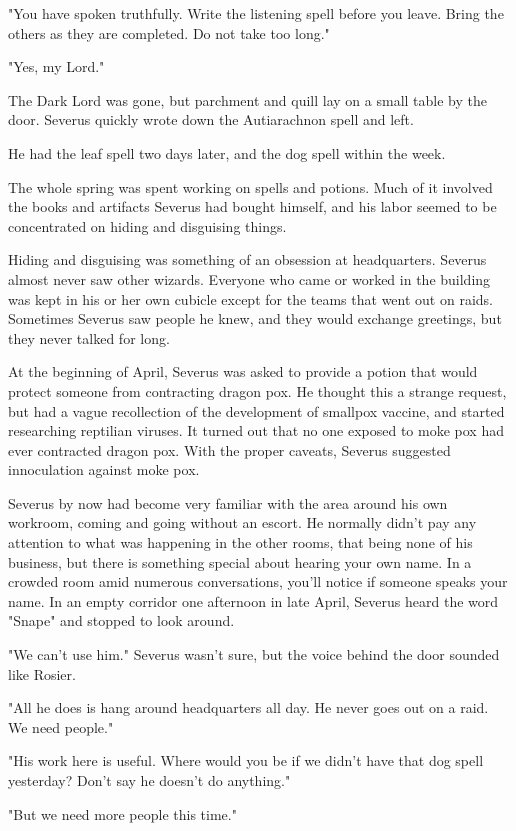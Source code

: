 \documentclass[a4paper,11pt]{article}
\begin{document}
"You have spoken truthfully. Write the listening spell before you leave. Bring the others as they are completed. Do not take too long."

"Yes, my Lord."

The Dark Lord was gone, but parchment and quill lay on a small table by the door. Severus quickly wrote down the Autiarachnon spell and left.

He had the leaf spell two days later, and the dog spell within the week.

The whole spring was spent working on spells and potions. Much of it involved the books and artifacts Severus had bought himself, and his labor seemed to be concentrated on hiding and disguising things.

Hiding and disguising was something of an obsession at headquarters. Severus almost never saw other wizards. Everyone who came or worked in the building was kept in his or her own cubicle except for the teams that went out on raids. Sometimes Severus saw people he knew, and they would exchange greetings, but they never talked for long.

At the beginning of April, Severus was asked to provide a potion that would protect someone from contracting dragon pox. He thought this a strange request, but had a vague recollection of the development of smallpox vaccine, and started researching reptilian viruses. It turned out that no one exposed to moke pox had ever contracted dragon pox. With the proper caveats, Severus suggested innoculation against moke pox.

Severus by now had become very familiar with the area around his own workroom, coming and going without an escort. He normally didn't pay any attention to what was happening in the other rooms, that being none of his business, but there is something special about hearing your own name. In a crowded room amid numerous conversations, you'll notice if someone speaks your name. In an empty corridor one afternoon in late April, Severus heard the word "Snape" and stopped to look around.

"We can't use him." Severus wasn't sure, but the voice behind the door sounded like Rosier.

"All he does is hang around headquarters all day. He never goes out on a raid. We need people."

"His work here is useful. Where would you be if we didn't have that dog spell yesterday? Don't say he doesn't do anything."

"But we need more people this time."
\end{document}
